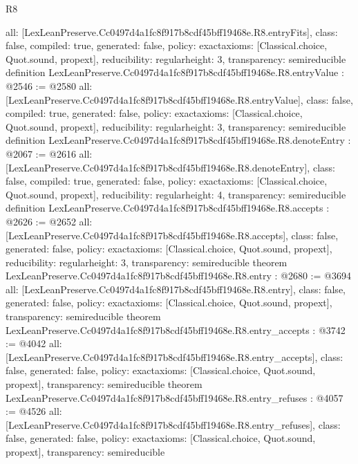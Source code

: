 \begin{lexlean}{R8}
\begin{coremodule}
{  all: [LexLeanPreserve.Cc0497d4a1fc8f917b8cdf45bff19468e.R8.entryFits],
  class: false,
  compiled: true,
  generated: false,
  policy: exact{axioms: [Classical.choice, Quot.sound, propext]},
  reducibility: regular{height: 3},
  transparency: semireducible
}
definition LexLeanPreserve.Cc0497d4a1fc8f917b8cdf45bff19468e.R8.entryValue : @2546 := @2580 {
  all: [LexLeanPreserve.Cc0497d4a1fc8f917b8cdf45bff19468e.R8.entryValue],
  class: false,
  compiled: true,
  generated: false,
  policy: exact{axioms: [Classical.choice, Quot.sound, propext]},
  reducibility: regular{height: 3},
  transparency: semireducible
}
definition LexLeanPreserve.Cc0497d4a1fc8f917b8cdf45bff19468e.R8.denoteEntry : @2067 := @2616 {
  all: [LexLeanPreserve.Cc0497d4a1fc8f917b8cdf45bff19468e.R8.denoteEntry],
  class: false,
  compiled: true,
  generated: false,
  policy: exact{axioms: [Classical.choice, Quot.sound, propext]},
  reducibility: regular{height: 4},
  transparency: semireducible
}
definition LexLeanPreserve.Cc0497d4a1fc8f917b8cdf45bff19468e.R8.accepts : @2626 := @2652 {
  all: [LexLeanPreserve.Cc0497d4a1fc8f917b8cdf45bff19468e.R8.accepts],
  class: false,
  generated: false,
  policy: exact{axioms: [Classical.choice, Quot.sound, propext]},
  reducibility: regular{height: 3},
  transparency: semireducible
}
theorem LexLeanPreserve.Cc0497d4a1fc8f917b8cdf45bff19468e.R8.entry : @2680 := @3694 {
  all: [LexLeanPreserve.Cc0497d4a1fc8f917b8cdf45bff19468e.R8.entry],
  class: false,
  generated: false,
  policy: exact{axioms: [Classical.choice, Quot.sound, propext]},
  transparency: semireducible
}
theorem LexLeanPreserve.Cc0497d4a1fc8f917b8cdf45bff19468e.R8.entry_accepts : @3742 := @4042 {
  all: [LexLeanPreserve.Cc0497d4a1fc8f917b8cdf45bff19468e.R8.entry_accepts],
  class: false,
  generated: false,
  policy: exact{axioms: [Classical.choice, Quot.sound, propext]},
  transparency: semireducible
}
theorem LexLeanPreserve.Cc0497d4a1fc8f917b8cdf45bff19468e.R8.entry_refuses : @4057 := @4526 {
  all: [LexLeanPreserve.Cc0497d4a1fc8f917b8cdf45bff19468e.R8.entry_refuses],
  class: false,
  generated: false,
  policy: exact{axioms: [Classical.choice, Quot.sound, propext]},
  transparency: semireducible
}


\end{coremodule}
\end{lexlean}
